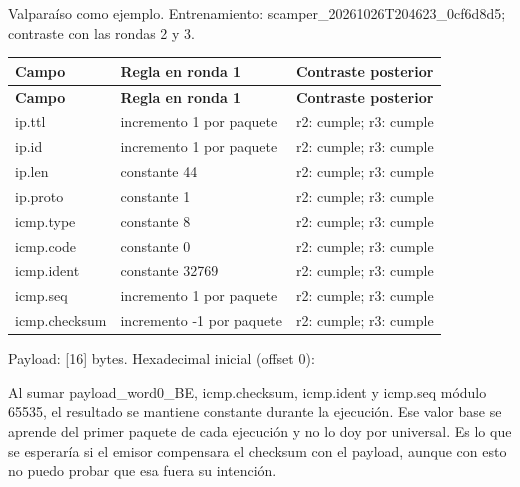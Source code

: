 
Valparaíso como ejemplo. Entrenamiento: scamper\_20261026T204623\_0cf6d8d5; contraste con las rondas 2 y 3. 


\begingroup
\fontsize{9}{11}\selectfont
\addtocounter{table}{-1}
\begin{longtable}{p{3.1cm}p{5.8cm}p{5.1cm}}
\toprule
\textbf{Campo} & \textbf{Regla en ronda 1} & \textbf{Contraste posterior} \\ \midrule
\endfirsthead
\toprule
\textbf{Campo} & \textbf{Regla en ronda 1} & \textbf{Contraste posterior} \\ \midrule
\endhead
ip.ttl & incremento 1 por paquete & r2: cumple; r3: cumple \\
ip.id & incremento 1 por paquete & r2: cumple; r3: cumple \\
ip.len & constante 44 & r2: cumple; r3: cumple \\
ip.proto & constante 1 & r2: cumple; r3: cumple \\
icmp.type & constante 8 & r2: cumple; r3: cumple \\
icmp.code & constante 0 & r2: cumple; r3: cumple \\
icmp.ident & constante 32769 & r2: cumple; r3: cumple \\
icmp.seq & incremento 1 por paquete & r2: cumple; r3: cumple \\
icmp.checksum & incremento -1 por paquete & r2: cumple; r3: cumple \\
\bottomrule
\end{longtable}
\endgroup
Payload: [16] bytes. Hexadecimal inicial (offset 0):


Al sumar payload\_word0\_BE, icmp.checksum, icmp.ident y icmp.seq módulo 65535, el resultado se mantiene constante durante la ejecución. Ese valor base se aprende del primer paquete de cada ejecución y no lo doy por universal. Es lo que se esperaría si el emisor compensara el checksum con el payload, aunque con esto no puedo probar que esa fuera su intención.

